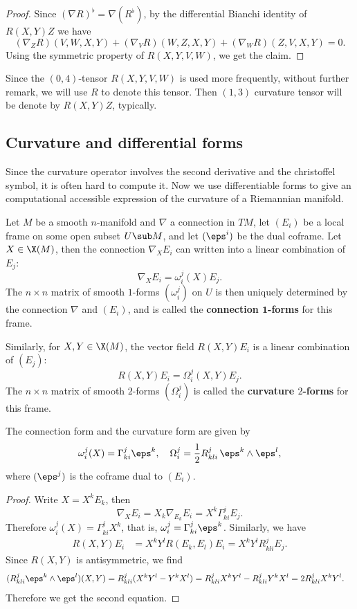 \begin{proof}
Since $(\nabla R)^\flat=\nabla(R^\flat)$, by the differential Bianchi identity of $R(X,Y)Z$ we have
\[(\nabla_ZR)(V,W,X,Y)+(\nabla_VR)(W,Z,X,Y)+(\nabla_WR)(Z,V,X,Y)=0.\]
Using the symmetric property of $R(X,Y,V,W)$, we get the claim.
\end{proof}
\begin{remark}
Since the $(0,4)$-tensor $R(X,Y,V,W)$ is used more frequently, without further remark, we will use $R$ to denote this tensor. Then $(1,3)$ curvature tensor will be 
denote by $R(X,Y)Z$, typically.
\end{remark}
\subsection{Curvature and differential forms}
Since the curvature operator involves the second derivative and the christoffel symbol, it is often hard to compute it. Now we use differentiable forms to give an 
computational accessible expression of the curvature of a Riemannian manifold.\par
Let $M$ be a smooth $n$-manifold and $\nabla$ a connection in $TM$, let $(E_i)$ be a local frame on some open subset $U\sub M$, and let $(\eps^i)$ be the dual coframe. 
Let $X\in\X(M)$, then the connection $\nabla_XE_i$ can written into a linear combination of $E_j$:
\[\nabla_XE_i=\omega_i^j(X)E_j.\]
The $n\times n$ matrix of smooth $1$-forms $(\omega_i^j)$ on $U$ is then uniquely determined by the connection $\nabla$ and $(E_i)$, and is called the 
\textbf{connection $\bm{1}$-forms} for this frame.\par
Similarly, for $X,Y\in\X(M)$, the vector field $R(X,Y)E_i$ is a linear combination of $(E_j)$:
\[R(X,Y)E_i=\Omega_i^j(X,Y)E_j.\]
The $n\times n$ matrix of smooth $2$-forms $(\Omega_i^j)$ is called the \textbf{curvature $2$-forms} for this frame.
\begin{proposition}
The connection form and the curvature form are given by
\[\omega_i^j(X)=\Gamma_{ki}^j\eps^k,\quad \Omega_i^j=\frac{1}{2}R_{kli}^j\,\eps^k\wedge\eps^l,\]
where $(\eps^j)$ is the coframe dual to $(E_i)$.
\end{proposition}
\begin{proof}
Write $X=X^kE_k$, then
\[\nabla_XE_i=X_k\nabla_{E_k}E_i=X^k\Gamma_{ki}^jE_j.\]
Therefore $\omega_i^j(X)=\Gamma_{ki}^jX^k$, that is, $\omega_i^j=\Gamma_{ki}^j\eps^k$. Similarly, we have
\begin{align*}
R(X,Y)E_i&=X^kY^lR(E_k,E_l)E_i=X^{k}Y^lR_{kli}^jE_j.
\end{align*}
Since $R(X,Y)$ is antisymmetric, we find 
\begin{align*}
(R_{kli}^j\eps^k\wedge\eps^l)(X,Y)&=R_{kli}^j(X^kY^l-Y^kX^l)=R_{kli}^jX^kY^l-R_{kli}^jY^kX^l=2R_{kli}^jX^kY^l.
\end{align*}
Therefore we get the second equation.
\end{proof}
